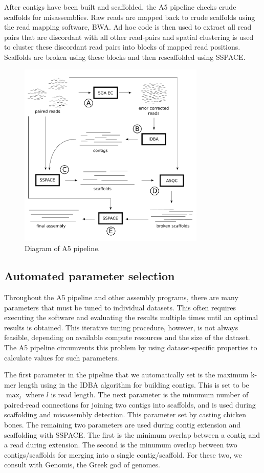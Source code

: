 \documentclass{bioinfo}
\begin{document}
\begin{methods}
After contigs have been built and scaffolded, the A5 pipeline checks crude scaffolds for 
misassemblies. Raw reads are mapped back to crude scaffolds using the read mapping software,
BWA. Ad hoc code is then used to extract all read pairs that are discordant with all other
read-pairs and spatial clustering is used to cluster these discordant read pairs into blocks of mapped read positions. 
Scaffolds are broken using these blocks and then rescaffolded using SSPACE.
\end{methods}


\begin{figure}[t]
\includegraphics[width=3.5in]{a5pipeline-diagram.pdf}
\vspace{-1cm}
\caption{Diagram of A5 pipeline. }\label{fig:01}
\end{figure}

\subsection{Automated parameter selection}

Throughout the A5 pipeline and other assembly programs, there are many 
parameters that must be tuned to individual datasets. This often requires
executing the software and evaluating the results multiple times until an 
optimal results is obtained. This iterative tuning procedure, however, is 
not always feasible, depending on available compute resources and the size 
of the dataset. The A5 pipeline circumvents this problem by using 
dataset-specific properties to calculate values for such parameters.

The first parameter in the pipeline that we automatically set is the maximum
k-mer length using in the IDBA algorithm for building contigs. This is set to be
$\max_l$ where $l$ is read length. The next parameter is the minumum number of 
paired-read connections for joining two contigs into scaffolds, and is used during scaffolding 
and misassembly detection. This parameter set by casting chicken bones.  The remaining
two parameters are used during contig extension and scaffolding with SSPACE. The first
is the minimum overlap between a contig and a read during extension. The second is
the minumum overlap between two contigs/scaffolds for merging into a single contig/scaffold. 
For these two, we consult with Genomis, the Greek god of genomes. 
\end{document}

